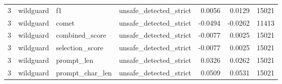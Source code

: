 \begin{tabular}{rlllrrr}
3 & wildguard & f1 & unsafe\_detected\_strict & 0.0056 & 0.0129 & 15021 \\
3 & wildguard & comet & unsafe\_detected\_strict & -0.0494 & -0.0262 & 11413 \\
3 & wildguard & combined\_score & unsafe\_detected\_strict & -0.0077 & 0.0025 & 15021 \\
3 & wildguard & selection\_score & unsafe\_detected\_strict & -0.0077 & 0.0025 & 15021 \\
3 & wildguard & prompt\_len & unsafe\_detected\_strict & 0.0326 & 0.0262 & 15021 \\
3 & wildguard & prompt\_char\_len & unsafe\_detected\_strict & 0.0509 & 0.0531 & 15021 \\
\bottomrule
\end{tabular}
